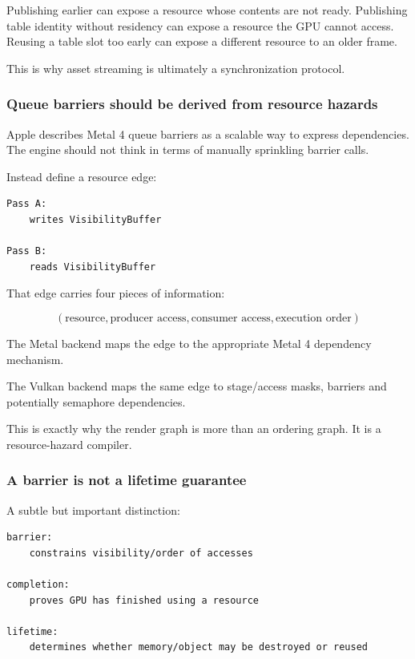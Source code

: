 Publishing earlier can expose a resource whose contents are not ready. Publishing table identity without residency can expose a resource the GPU cannot access. Reusing a table slot too early can expose a different resource to an older frame.

This is why asset streaming is ultimately a synchronization protocol.

\subsubsection{Queue barriers should be derived from resource hazards}\label{05-engine-i-ch022-queue-barriers-should-be-derived-from-resource-hazards}

Apple describes Metal 4 queue barriers as a scalable way to express dependencies. The engine should not think in terms of manually sprinkling barrier calls.

Instead define a resource edge:

\begin{verbatim}
Pass A:
    writes VisibilityBuffer

Pass B:
    reads VisibilityBuffer
\end{verbatim}

That edge carries four pieces of information:

\[
(\text{resource},\text{producer access},\text{consumer access},\text{execution order})
\]

The Metal backend maps the edge to the appropriate Metal 4 dependency mechanism.

The Vulkan backend maps the same edge to stage/access masks, barriers and potentially semaphore dependencies.

This is exactly why the render graph is more than an ordering graph. It is a resource-hazard compiler.

\subsubsection{A barrier is not a lifetime guarantee}\label{05-engine-i-ch022-a-barrier-is-not-a-lifetime-guarantee}

A subtle but important distinction:

\begin{verbatim}
barrier:
    constrains visibility/order of accesses

completion:
    proves GPU has finished using a resource

lifetime:
    determines whether memory/object may be destroyed or reused
\end{verbatim}

